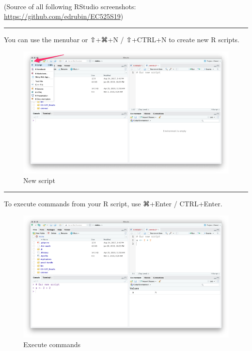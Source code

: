 \documentclass[]{book}
\begin{document}
(Source of all following RStudio screenshots: \url{https://github.com/edrubin/EC525S19})

\begin{center}\rule{0.5\linewidth}{\linethickness}\end{center}

You can use the menubar or ⇧+⌘+N / ⇧+CTRL+N to create new R scripts.

\begin{figure}
\centering
\includegraphics{img/rstudio_source_arrow.png}
\caption{New script}
\end{figure}

\begin{center}\rule{0.5\linewidth}{\linethickness}\end{center}

To execute commands from your R script, use ⌘+Enter / CTRL+Enter.

\begin{figure}
\centering
\includegraphics{img/rstudio_source_ex.png}
\caption{Execute commands}
\end{figure}
\end{document}
